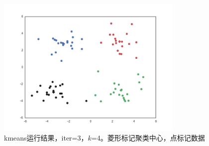 \documentclass{ctexart}
\begin{document}
\begin{figure}[H]
\begin{center}
\includegraphics[width=0.8\textwidth]{fig/iter-03.png} %
\caption{kmeans运行结果，iter=3，$k$=4。菱形标记聚类中心，点标记数据}
\end{center}
\end{figure}
\end{document}
